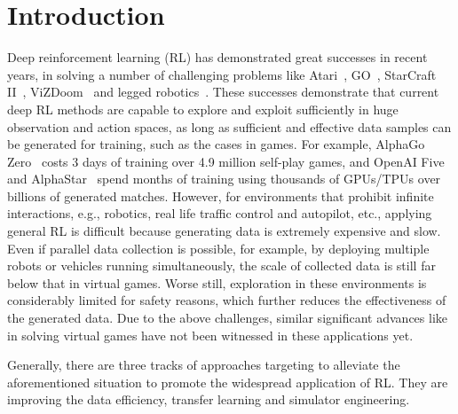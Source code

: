 \documentclass[letterpaper]{article} %
\begin{document}
\section{Introduction}
Deep reinforcement learning (RL) has demonstrated great successes in recent years, in solving a number of challenging problems like Atari~\citep{mnih2015human}, GO~\citep{silver2016mastering,silver2017mastering}, 
StarCraft II~\citep{astar,han2020tstarbot}, ViZDoom~\citep{li2023fittest} and legged robotics~\cite{han2023lifelike}.
These successes demonstrate that current deep RL methods are capable to explore and exploit sufficiently in huge observation and action spaces, as long as sufficient and effective data samples can be generated for training, such as the cases in games. For example, AlphaGo Zero~\citep{silver2017mastering} costs 3 days of training over 4.9 million self-play games, and OpenAI Five~\citep{OpenAI_dota} and AlphaStar~\citep{astar} spend months of training using thousands of GPUs/TPUs over billions of generated matches. 
However, for environments that prohibit infinite interactions, e.g., robotics, real life traffic control and autopilot, etc., applying general RL is difficult because generating data is extremely expensive and slow. Even if parallel data collection is possible, for example, by deploying multiple robots or vehicles running simultaneously, the scale of collected data is still far below that in virtual games. Worse still, exploration in these environments is considerably limited for safety reasons, which further reduces the effectiveness of the generated data. Due to the above challenges, similar significant advances like in solving virtual games have not been witnessed in these applications yet.

Generally, there are three tracks of approaches targeting to alleviate the aforementioned situation to promote the widespread application of RL. They are improving the data efficiency, transfer learning and simulator engineering. 
\end{document}
